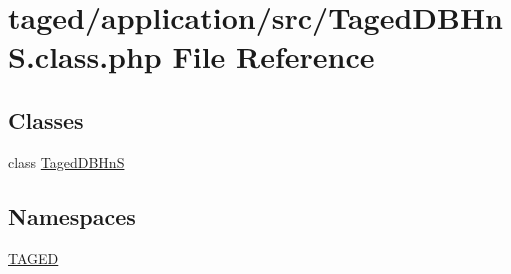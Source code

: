 \hypertarget{_taged_d_b_hn_s_8class_8php}{}\section{taged/application/src/\+Taged\+D\+B\+HnS.class.\+php File Reference}
\label{_taged_d_b_hn_s_8class_8php}
\subsection*{Classes}
\begin{DoxyCompactItemize}
\item 
class \hyperlink{class_taged_d_b_hn_s}{Taged\+D\+B\+HnS}
\end{DoxyCompactItemize}
\subsection*{Namespaces}
\begin{DoxyCompactItemize}
\item 
 \hyperlink{namespace_t_a_g_e_d}{T\+A\+G\+ED}
\end{DoxyCompactItemize}
